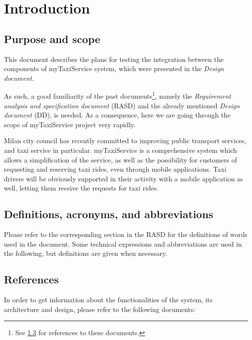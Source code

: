 \chapter{Introduction} \label{chap:introduction}



\section{Purpose and scope}
This document describes the plans for testing the integration between the components of myTaxiService system, which were presented in the \emph{Design document}.

As such, a good familiarity of the past documents\footnote{See \cref{sec:references} for references to these documents.}, namely the \emph{Requirement analysis and specification document} (RASD) and the already mentioned \emph{Design document} (DD), is needed. As a consequence, here we are going through the scope of myTaxiService project very rapidly.

Milan city council has recently committed to improving public transport services, and taxi service in particular. myTaxiService is a comprehensive system which allows a simplification of the service, as well as the possibility for customers of requesting and reserving taxi rides, even through mobile applications. Taxi drivers will be obviously supported in their activity with a mobile application as well, letting them receive the requests for taxi rides.



\section{Definitions, acronyms, and abbreviations}
Please refer to the corresponding section in the RASD for the definitions of words used in the document. Some technical expressions and abbreviations are used in the following, but definitions are given when necessary. 



\section{References}\label{sec:references}
In order to get information about the functionalities of the system, its architecture and design, please refer to the following documents:

